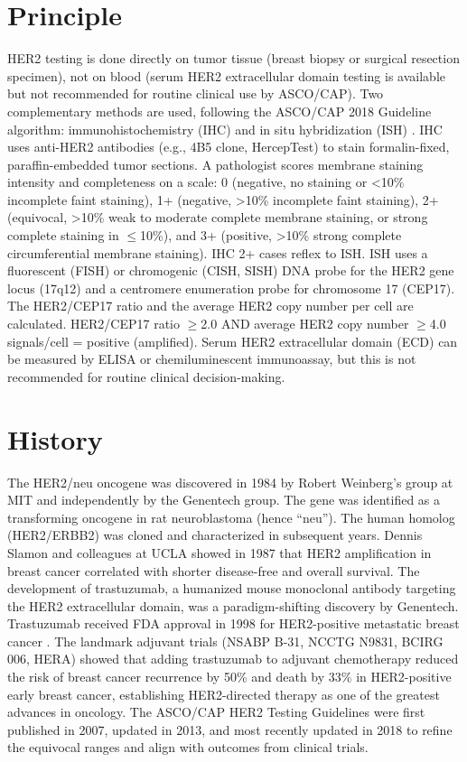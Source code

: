 \section*{Principle}
HER2 testing is done directly on tumor tissue (breast biopsy or surgical resection specimen), not on blood (serum HER2 extracellular domain testing is available but not recommended for routine clinical use by ASCO/CAP). Two complementary methods are used, following the ASCO/CAP 2018 Guideline algorithm: immunohistochemistry (IHC) and in situ hybridization (ISH) \cite{wolff2018human}. IHC uses anti-HER2 antibodies (e.g., 4B5 clone, HercepTest) to stain formalin-fixed, paraffin-embedded tumor sections. A pathologist scores membrane staining intensity and completeness on a scale: 0 (negative, no staining or <10\% incomplete faint staining), 1+ (negative, >10\% incomplete faint staining), 2+ (equivocal, >10\% weak to moderate complete membrane staining, or strong complete staining in $\leq$10\%), and 3+ (positive, >10\% strong complete circumferential membrane staining). IHC 2+ cases reflex to ISH. ISH uses a fluorescent (FISH) or chromogenic (CISH, SISH) DNA probe for the HER2 gene locus (17q12) and a centromere enumeration probe for chromosome 17 (CEP17). The HER2/CEP17 ratio and the average HER2 copy number per cell are calculated. HER2/CEP17 ratio $\geq$2.0 AND average HER2 copy number $\geq$4.0 signals/cell = positive (amplified). Serum HER2 extracellular domain (ECD) can be measured by ELISA or chemiluminescent immunoassay, but this is not recommended for routine clinical decision-making.

\section*{History}
The HER2/neu oncogene was discovered in 1984 by Robert Weinberg's group at MIT and independently by the Genentech group. The gene was identified as a transforming oncogene in rat neuroblastoma (hence ``neu''). The human homolog (HER2/ERBB2) was cloned and characterized in subsequent years. Dennis Slamon and colleagues at UCLA showed in 1987 that HER2 amplification in breast cancer correlated with shorter disease-free and overall survival. The development of trastuzumab, a humanized mouse monoclonal antibody targeting the HER2 extracellular domain, was a paradigm-shifting discovery by Genentech. Trastuzumab received FDA approval in 1998 for HER2-positive metastatic breast cancer \cite{slamon2001use}. The landmark adjuvant trials (NSABP B-31, NCCTG N9831, BCIRG 006, HERA) showed that adding trastuzumab to adjuvant chemotherapy reduced the risk of breast cancer recurrence by 50\% and death by 33\% in HER2-positive early breast cancer, establishing HER2-directed therapy as one of the greatest advances in oncology. The ASCO/CAP HER2 Testing Guidelines were first published in 2007, updated in 2013, and most recently updated in 2018 to refine the equivocal ranges and align with outcomes from clinical trials.

